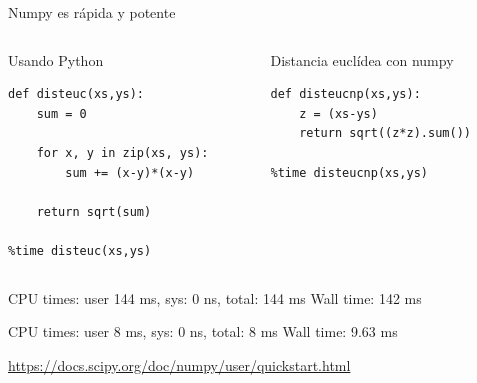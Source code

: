 \documentclass[bigger,unknownkeysallowed]{beamer}
\begin{document}
\begin{frame}[fragile,label={sec:orgd4c8fa4}]{Numpy es rápida y potente}
 \begin{columns}
\begin{column}{0.5\columnwidth}
\begin{block}{Usando Python}
\lstset{language=Python,label= ,caption= ,captionpos=b,numbers=none}
\begin{lstlisting}
def disteuc(xs,ys):
    sum = 0

    for x, y in zip(xs, ys):
        sum += (x-y)*(x-y)

    return sqrt(sum)

%time disteuc(xs,ys)
\end{lstlisting}
\end{block}
\end{column}

\begin{column}{0.5\columnwidth}
\begin{block}{Distancia euclídea con numpy}
\lstset{language=Python,label= ,caption= ,captionpos=b,numbers=none}
\begin{lstlisting}
def disteucnp(xs,ys):
    z = (xs-ys)
    return sqrt((z*z).sum())

%time disteucnp(xs,ys)
\end{lstlisting}
\end{block}
\end{column}
\end{columns}

\begin{block}{}
\scriptsize
CPU times: user 144 ms, sys: 0 ns, total: 144 ms
Wall time: 142 ms
\end{block}

\begin{block}{}
\scriptsize
CPU times: user 8 ms, sys: 0 ns, total: 8 ms
Wall time: 9.63 ms
\end{block}

{\color{blue}\href{https://docs.scipy.org/doc/numpy/user/quickstart.html}{https://docs.scipy.org/doc/numpy/user/quickstart.html}}
\end{frame}
\end{document}
